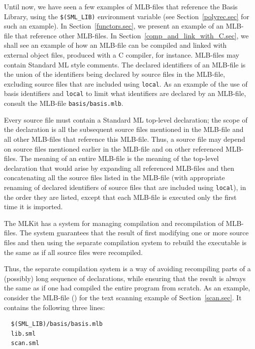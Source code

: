 \documentclass[12pt]{book}
\begin{document}
Until now, we have seen a few examples of MLB-files that reference the
Basis Library, using the \texttt{\$(SML\_LIB)} environment variable
(see Section~\ref{polyrec.sec} for such an example). In
Section~\ref{functors.sec}, we present an example of an MLB-file that
reference other MLB-files. In Section~\ref{comp_and_link_with_C.sec},
we shall see an example of how an MLB-file can be compiled and linked
with external object files, produced with a C compiler, for instance.
MLB-files may contain Standard ML style
%
%
comments. The declared identifiers of an MLB-file is the union of the
identifiers being declared by source files in the MLB-file, excluding
source files that are included using {\tt local}. As an example of the
use of basis identifiers and {\tt local} to limit what identifiers are
declared by an MLB-file, consult the MLB-file {\tt basis/basis.mlb}.

Every source file must contain a Standard ML top-level declaration;
the scope of the declaration is all the subsequent source files
mentioned in the MLB-file and all other MLB-files that reference this
MLB-file. Thus, a source file may depend on source files mentioned
earlier in the MLB-file and on other referenced MLB-files.  The
meaning of an entire MLB-file is the meaning of the top-level
declaration that would arise by expanding all referenced MLB-files and
then concatenating all the source files listed in the MLB-file (with
appropriate renaming of declared identifiers of source files that are
included using {\tt local}), in the order they are listed, except that
each MLB-file is executed only the first time it is imported.

The MLKit has a system for managing compilation and recompilation of
%
MLB-files.  The system guarantees that the result of first modifying
one or more source files and then using the separate
compilation system to rebuild the executable is the same as if all
%
source files were
%
recompiled.

Thus, the separate compilation system is a way of avoiding recompiling
parts of a (possibly) long sequence of declarations, while ensuring
that the result is always the same as if one had compiled the entire
program from scratch.  As an example, consider the MLB-file
() for the text scanning example of
Section~\ref{scan.sec}. It contains the following three lines:
\begin{verbatim}
  $(SML_LIB)/basis/basis.mlb
  lib.sml
  scan.sml
\end{verbatim}
\end{document}
